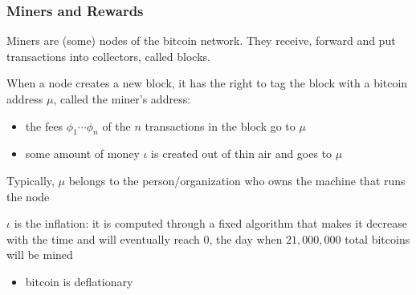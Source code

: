 \documentclass[11pt]{beamer}  %
\begin{document}
\begin{frame}\frametitle{Miners and Rewards}

  Miners are (some) nodes of the bitcoin network. They receive, forward
  and put transactions into collectors, called \alert{blocks}.

  When a node creates a new block, it has the right to tag the block
  with a bitcoin address $\mu$, called the \alert{miner}'s address:

  \begin{itemize}
  \item the fees $\phi_1\cdots\phi_n$ of the $n$ transactions in the block go to $\mu$
  \item some amount of money $\iota$ is created out of thin air and goes to $\mu$
  \end{itemize}

  \medskip
  \begin{greenbox}{}
    Typically, $\mu$ belongs to the person/organization who owns the machine that runs the node
  \end{greenbox}

  \medskip
  \begin{greenbox}{}
    $\iota$ is the \alert{inflation}: it is computed through a fixed algorithm that makes it decrease with the time
    and will eventually reach $0$, the day when $21,000,000$ total bitcoins will be mined
    \begin{itemize}
    \item bitcoin is deflationary
    \end{itemize}
  \end{greenbox}

\end{frame}
\end{document}
